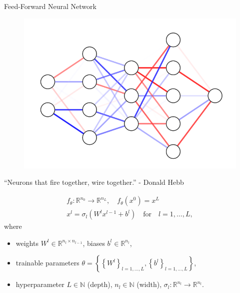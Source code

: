 \documentclass[9pt]{beamer}
\begin{document}
\begin{frame}{Feed-Forward Neural Network}
    \begin{figure}[H]
        \begin{center}
            \includegraphics[scale=0.35]{img/Neural Network.png}
        \end{center}
    \end{figure}
    \begin{center}
        \small{“Neurons that fire together, wire together.” - Donald Hebb}
    \end{center}
    \begin{equation*}
        \begin{gathered}
            f_{\theta} \colon \mathbb{R}^{n_0} \to \mathbb{R}^{n_L}, \quad f_{\theta} \left( x^{0}\right) = x^{L} \\
            x^{l} = \sigma_l \left( W^l x^{l-1} + b^l \right) \quad \text{for} \quad l = 1, \ldots, L, 
        \end{gathered}
    \end{equation*}
    where 
    \begin{itemize}
        \item weights $W^l \in \mathbb{R}^{n_l \times n_{l-1}}$, biases $b^l \in \mathbb{R}^{n_l}$,
        \item trainable parameters $\theta = \left\{ \left\{ W^l \right\}_{l=1, \ldots, L}, \left\{ b^l \right\}_{l=1, \ldots, L} \right\}$,
        \item hyperparameter $L \in \mathbb{N}$ (depth), $n_l \in \mathbb{N}$ (width), $\sigma_l \colon \mathbb{R}^{n_l} \to \mathbb{R}^{n_l}$.
    \end{itemize}

\end{frame}
\end{document}
